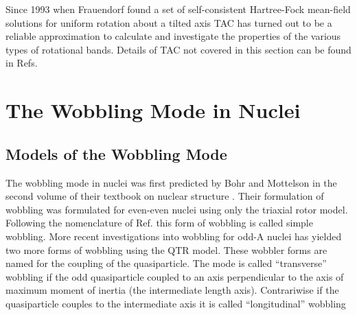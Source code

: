 Since 1993 when Frauendorf found a set of self-consistent Hartree-Fock mean-field solutions for uniform rotation about a tilted axis \cite{frauendorfTiltedCranking} TAC has turned out to be a reliable approximation to calculate and investigate the properties of the various types of rotational bands. Details of TAC not covered in this section can be found in Refs. \cite{frauendorfTiltedCranking,frauendorfTACMultiQPBands,frauendorfChirality,frauendorfTAC}

\section{The Wobbling Mode in Nuclei}
\label{sec:models-wobbling-mode}
\subsection{Models of the Wobbling Mode}
\label{ssec:models-wobbling-models}
The wobbling mode in nuclei was first predicted by Bohr and Mottelson in the second volume of their textbook on nuclear structure \cite{bohrMottelson2}. Their formulation of wobbling was formulated for even-even nuclei using only the triaxial rotor model. Following the nomenclature of Ref. \cite{frauendorfTransverseWobbling} this form of wobbling is called simple wobbling. More recent investigations \cite{frauendorfTransverseWobbling} into wobbling for odd-A nuclei has yielded two more forms of wobbling using the QTR model. These wobbler forms are named for the coupling of the quasiparticle. The mode is called ``transverse'' wobbling if the odd quasiparticle coupled to an axis perpendicular to the axis of maximum moment of inertia (the intermediate length axis). Contrariwise if the quasiparticle couples to the intermediate axis it is called ``longitudinal'' wobbling
